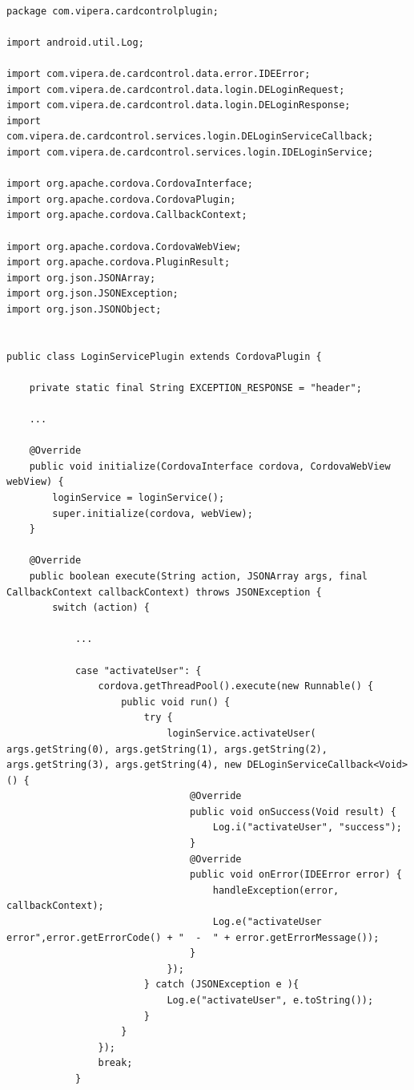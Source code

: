 \documentclass[a4paper, 12pt]{article}
\newenvironment{code}{\captionsetup{type=listing}}{}
\begin{document}
\begin{code}
\label{code:cordova-android}
\begin{verbatim}

package com.vipera.cardcontrolplugin;

import android.util.Log;

import com.vipera.de.cardcontrol.data.error.IDEError;
import com.vipera.de.cardcontrol.data.login.DELoginRequest;
import com.vipera.de.cardcontrol.data.login.DELoginResponse;
import com.vipera.de.cardcontrol.services.login.DELoginServiceCallback;
import com.vipera.de.cardcontrol.services.login.IDELoginService;

import org.apache.cordova.CordovaInterface;
import org.apache.cordova.CordovaPlugin;
import org.apache.cordova.CallbackContext;

import org.apache.cordova.CordovaWebView;
import org.apache.cordova.PluginResult;
import org.json.JSONArray;
import org.json.JSONException;
import org.json.JSONObject;


public class LoginServicePlugin extends CordovaPlugin {

    private static final String EXCEPTION_RESPONSE = "header";

    ...

    @Override
    public void initialize(CordovaInterface cordova, CordovaWebView webView) {
        loginService = loginService();
        super.initialize(cordova, webView);
    }

    @Override
    public boolean execute(String action, JSONArray args, final CallbackContext callbackContext) throws JSONException {
        switch (action) {

            ...

            case "activateUser": {
                cordova.getThreadPool().execute(new Runnable() {
                    public void run() {
                        try {
                            loginService.activateUser( args.getString(0), args.getString(1), args.getString(2), args.getString(3), args.getString(4), new DELoginServiceCallback<Void>() {
                                @Override
                                public void onSuccess(Void result) {
                                    Log.i("activateUser", "success");
                                }
                                @Override
                                public void onError(IDEError error) {
                                    handleException(error, callbackContext);
                                    Log.e("activateUser error",error.getErrorCode() + "  -  " + error.getErrorMessage());
                                }
                            });
                        } catch (JSONException e ){
                            Log.e("activateUser", e.toString());
                        }
                    }
                });
                break;
            }


\end{verbatim}
\end{code}
\end{document}
